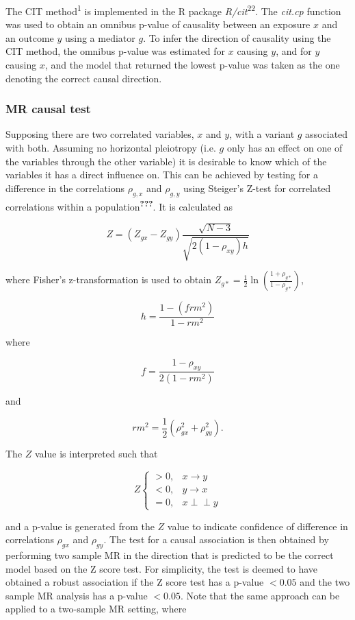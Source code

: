 \documentclass[]{article}
\begin{document}
The CIT method\textsuperscript{1} is implemented in the R package
\emph{R/cit}\textsuperscript{22}. The \emph{cit.cp} function was used to
obtain an omnibus p-value of causality between an exposure \(x\) and an
outcome \(y\) using a mediator \(g\). To infer the direction of
causality using the CIT method, the omnibus p-value was estimated for
\(x\) causing \(y\), and for \(y\) causing \(x\), and the model that
returned the lowest p-value was taken as the one denoting the correct
causal direction.

\subsubsection{MR causal test}\label{mr-causal-test}

Supposing there are two correlated variables, \(x\) and \(y\), with a
variant \(g\) associated with both. Assuming no horizontal pleiotropy
(i.e. \(g\) only has an effect on one of the variables through the other
variable) it is desirable to know which of the variables it has a direct
influence on. This can be achieved by testing for a difference in the
correlations \(\rho_{g, x}\) and \(\rho_{g, y}\) using Steiger's Z-test
for correlated correlations within a
population\textsuperscript{\textbf{???}}. It is calculated as

\[
Z = (Z_{gx} - Z_{gy}) \frac{\sqrt{N-3}}{\sqrt{2(1-\rho_{xy})h}}
\]

where Fisher's z-transformation is used to obtain
\(Z_{g*} = \frac{1}{2} \ln \left ( \frac{1+\rho_{g*}}{1-\rho_{g*}} \right )\),

\[
h = \frac{1 - (frm^2)} {1 - rm^2}
\]

where

\[
f = \frac{1 - \rho_{xy}}{2(1 - rm^2)}
\]

and

\[
rm^2 = \frac{1}{2}(\rho_{gx}^2 + \rho_{gy}^2).
\]

The \(Z\) value is interpreted such that

\[
Z \left\{
\begin{array}{ll}
> 0, & x \to y\\
< 0, & y \to x\\
= 0, & x \perp\!\!\!\perp y 
\end{array} \right.
\]

and a p-value is generated from the \(Z\) value to indicate confidence
of difference in correlations \(\rho_{gx}\) and \(\rho_{gy}\). The test
for a causal association is then obtained by performing two sample MR in
the direction that is predicted to be the correct model based on the Z
score test. For simplicity, the test is deemed to have obtained a robust
association if the Z score test has a p-value \(< 0.05\) and the two
sample MR analysis has a p-value \(< 0.05\). Note that the same approach
can be applied to a two-sample MR setting, where
\end{document}
